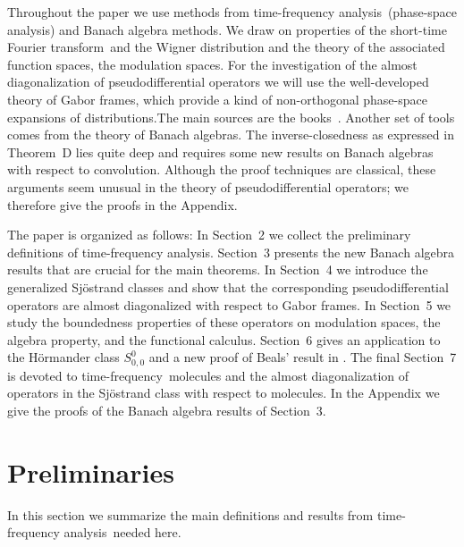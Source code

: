 \documentclass[12pt]{amsart}
\theoremstyle{definition}
\theoremstyle{remark}
\numberwithin{equation}{section}
\newcommand{\tfa}{time-frequency analysis}
\newcommand{\stft}{short-time Fourier transform}
\newcommand{\tf}{time-frequency}
\newcommand{\modsp}{modulation space}
\newcommand{\psdo}{pseudodifferential operator}
\def\bZ{{\mathbb{Z}}}
\def\zd{\bZ^d}
\begin{document}
Throughout the paper we use methods from \tfa\ (phase-space analysis)
and Banach algebra methods. We draw on properties of the \stft\ and
the Wigner distribution and the theory of the associated function
spaces, the \modsp s. For the investigation of the almost
diagonalization of \psdo s we will use the well-developed theory of
Gabor frames, which provide a  kind of 
non-orthogonal phase-space expansions of distributions.The main sources are the
books~\cite{folland89,book}.  Another set of tools comes from
the theory of Banach algebras. The inverse-closedness as expressed in
Theorem~D lies quite deep and requires  some new results on Banach
algebras with respect to convolution.    Although the
proof techniques are classical, these arguments seem unusual in the
theory of \psdo s; we therefore  give the proofs in the Appendix.





The paper is organized as follows: In Section~2 we collect the
preliminary definitions of \tfa . Section~3 presents the new  Banach
algebra results that are crucial for the main theorems. In
Section~4 we introduce the generalized Sj\"ostrand classes and show
that the corresponding \psdo s are almost diagonalized with respect to
Gabor frames. In Section~5 we study the boundedness properties of
these operators on \modsp s, the algebra property, and the functional
calculus. Section~6 gives an application to the H\"ormander class
$S^0_{0,0}$ and a new proof of Beals' result in \cite{beals77}. The
final Section~7 is devoted to \tf\ molecules and the almost
diagonalization of operators in the Sj\"ostrand class with respect to
molecules. In the Appendix we give the proofs of the Banach algebra
results of Section~3. 






\section{Preliminaries}

In this section we summarize the main definitions and results from
\tfa\ needed here.
\end{document}
